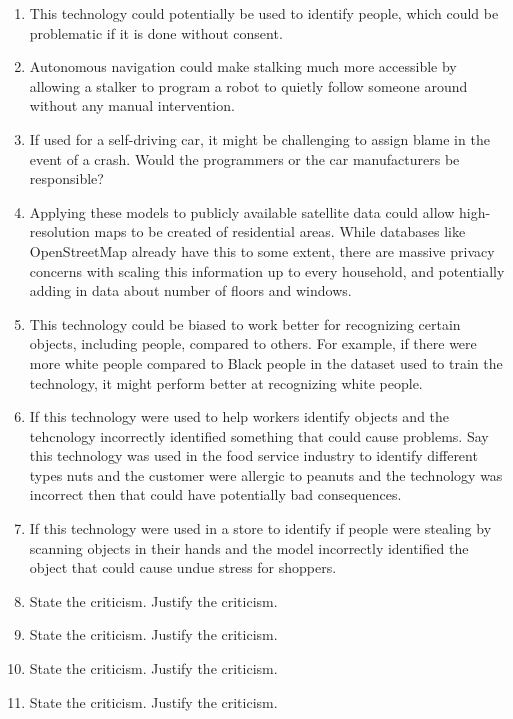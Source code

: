 \begin{enumerate}
    \item This technology could potentially be used to identify people, which could be problematic if it is done without consent.
    \item Autonomous navigation could make stalking much more accessible by allowing a stalker to program a robot to quietly follow someone around without any manual intervention.
    \item If used for a self-driving car, it might be challenging to assign blame in the event of a crash. Would the programmers or the car manufacturers be responsible?
    \item Applying these models to publicly available satellite data could allow high-resolution maps to be created of residential areas. While databases like OpenStreetMap already have this to some extent, there are massive privacy concerns with scaling this information up to every household, and potentially adding in data about number of floors and windows.
    \item This technology could be biased to work better for recognizing certain objects, including people, compared to others. For example, if there were more white people compared to Black people in the dataset used to train the technology, it might perform better at recognizing white people.
    \item If this technology were used to help workers identify objects and the tehcnology incorrectly identified something that could cause problems. Say this technology was used in the food service industry to identify different types nuts and the customer were allergic to peanuts and the technology was incorrect then that could have potentially bad consequences. 
    \item If this technology were used in a store to identify if people were stealing by scanning objects in their hands and the model incorrectly identified the object that could cause undue stress for shoppers. 
    \item State the criticism. Justify the criticism.
    \item State the criticism. Justify the criticism.
    \item State the criticism. Justify the criticism.
    \item State the criticism. Justify the criticism.
\end{enumerate}


